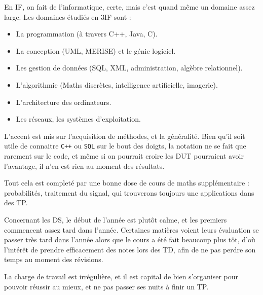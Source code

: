 En IF, on fait de l'informatique, certe, mais c'est quand même un domaine assez
large. Les domaines étudiés en 3IF sont :
\begin{itemize}
    \item La programmation (à travers C++, Java, C).
    \item La conception (UML, MERISE) et le génie logiciel.
    \item Les gestion de données (SQL, XML, administration, algèbre relationnel).
    \item L'algorithmie (Maths discrètes, intelligence artificielle, imagerie).
    \item L'architecture des ordinateurs.
    \item Les réseaux, les systèmes d'exploitation.
\end{itemize}

L'accent est mis sur l'acquisition de méthodes, et la généralité. Bien qu'il
soit utile de connaitre \texttt{C++} ou \texttt{SQL} sur le bout des doigts, la notation ne se
fait que rarement sur le code, et même si on pourrait croire les DUT pourraient
avoir l'avantage, il n'en est rien au moment des résultats.

Tout cela est completé par une bonne dose de cours de maths supplémentaire : probabilités,
traitement du signal, qui trouverons toujours une applications dans des TP.

Concernant les DS, le début de l'année est plutôt calme, et les premiers
commencent assez tard dans l'année. Certaines matières voient leurs évaluation se
passer très tard dans l'année alors que le cours a été fait beaucoup plus tôt,
d'où l'intérêt de prendre efficacement des notes lors des TD, afin de ne
pas perdre son temps au moment des révisions.

La charge de travail est irrégulière, et il est capital de bien s'organiser pour
pouvoir réussir au mieux, et ne pas passer ses nuits à finir un TP.

